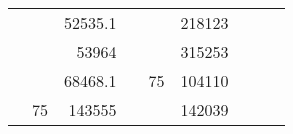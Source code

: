 \begin{table}[]
\begin{tabular}{|ccrccrccc}
\multicolumn{1}{|c|}{\cellcolor[HTML]{FFFFC7}}                                & \multicolumn{1}{c|}{\cellcolor[HTML]{DAE8FC}}                      & \multicolumn{1}{r|}{\cellcolor[HTML]{DAE8FC}52535.1}   & \multicolumn{1}{c|}{\cellcolor[HTML]{FFFFC7}}                                & \multicolumn{1}{c|}{\cellcolor[HTML]{DAE8FC}}                       & \multicolumn{1}{r|}{\cellcolor[HTML]{DDFDFF}218123}    &                                                                              &                                                                    &                                                        \\ \cline{3-3} \cline{6-6}
\multicolumn{1}{|c|}{\cellcolor[HTML]{FFFFC7}}                                & \multicolumn{1}{c|}{\cellcolor[HTML]{DAE8FC}}                      & \multicolumn{1}{r|}{\cellcolor[HTML]{DDFDFF}53964}     & \multicolumn{1}{c|}{\cellcolor[HTML]{FFFFC7}}                                & \multicolumn{1}{c|}{\cellcolor[HTML]{DAE8FC}}                       & \multicolumn{1}{r|}{\cellcolor[HTML]{DAE8FC}315253}    &                                                                              &                                                                    &                                                        \\ \cline{3-3} \cline{6-6}
\multicolumn{1}{|c|}{\cellcolor[HTML]{FFFFC7}}                                & \multicolumn{1}{c|}{\cellcolor[HTML]{DAE8FC}}                      & \multicolumn{1}{r|}{\cellcolor[HTML]{DAE8FC}68468.1}   & \multicolumn{1}{c|}{\cellcolor[HTML]{FFFFC7}}                                & \multicolumn{1}{c|}{\multirow{-10}{*}{\cellcolor[HTML]{DAE8FC}75}}  & \multicolumn{1}{r|}{\cellcolor[HTML]{DDFDFF}104110}    &                                                                              &                                                                    &                                                        \\ \cline{3-3} \cline{5-6}
\multicolumn{1}{|c|}{\cellcolor[HTML]{FFFFC7}}                                & \multicolumn{1}{c|}{\multirow{-10}{*}{\cellcolor[HTML]{DAE8FC}75}} & \multicolumn{1}{r|}{\cellcolor[HTML]{DDFDFF}143555}    & \multicolumn{1}{c|}{\cellcolor[HTML]{FFFFC7}}                                & \multicolumn{1}{c|}{\cellcolor[HTML]{DDFDFF}}                       & \multicolumn{1}{r|}{\cellcolor[HTML]{DAE8FC}142039}    &                                                                              &                                                                    &                                                        \\ \cline{2-3} \cline{6-6}

\end{tabular}
\end{table}
